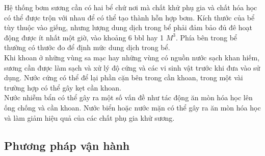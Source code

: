 \documentclass[12pt,a4paper]{article}
\begin{document}
	Hệ thống bơm sương cần có hai bể chứ nơi mà chất khử phụ gia và chất hóa học có thể được trộn với nhau để có thể tạo thành hỗn hợp bơm. Kích thước của bể tùy thuộc vào giếng, nhưng lượng dung dịch trong bể phải đảm bảo đủ đê hoạt động được ít nhất một giờ, vào khoảng 6 bbl hay 1 $M^3$. Phía bên trong bể thường có thước đo để định mức dung dịch trong bể.\\
	Khi khoan ở những vùng sa mạc hay những vùng có nguồn nước sạch khan hiếm, sương cần được làm sạch và xử lý độ cứng và các vi sinh vật trước khi đưa vào sử dụng. Nước cứng có thể để lại phần cặn bên trong cần khoan, trong một vài trường hợp có thể gây kẹt cần khoan.\\
	Nước nhiễm bẩn có thể gây ra một số vấn đề như tác động ăn mòn hóa học lên ống chống và cần khoan. Nước biển hoặc nước mặn có thể gây ra ăn mòn hóa học và làm giảm hiệu quả của các chất phụ gia khử sương.
\subsection{Phương pháp vận hành}
\end{document}
